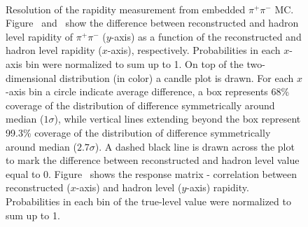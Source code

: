 \begin{figure}[h]
\parbox{0.4725\textwidth}{
  \centering
  \begin{subfigure}[b]{\linewidth}\addtocounter{subfigure}{-2}\vspace*{-12pt}
  \end{subfigure}\\
    \begin{minipage}[t][1.042\linewidth][t]{\linewidth}\vspace{10pt}
    \caption[Resolution of the rapidity measurement from embedded $\pi^{+}\pi^{-}$ MC.]{Resolution of the rapidity measurement from embedded $\pi^{+}\pi^{-}$ MC. Figure~ and~ show the difference between reconstructed and hadron level rapidity of $\pi^{+}\pi^{-}$ ($y$-axis) as a function of the reconstructed and hadron level rapidity ($x$-axis), respectively. Probabilities in each $x$-axis bin were normalized to sum up to 1. On top of the two-dimensional distribution (in color) a candle plot is drawn. For each $x$-axis bin a circle indicate average difference, a box represents 68\% coverage of the distribution of difference symmetrically around median ($1\sigma$), while vertical lines extending beyond the box represent 99.3\% coverage of the distribution of difference symmetrically around median ($2.7\sigma$). A dashed black line is drawn across the plot to mark the difference between reconstructed and hadron level value equal to 0. Figure~ shows the response matrix - correlation between reconstructed ($x$-axis) and hadron level ($y$-axis) rapidity. Probabilities in each bin of the true-level value were normalized to sum up to 1.}\label{fig:Response_PairRapidity}%
  \end{minipage}
}%
\end{figure}


